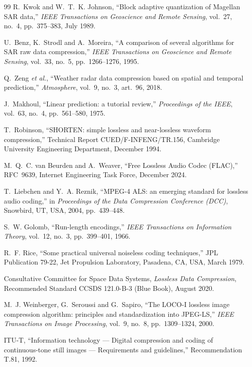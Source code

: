 \begin{thebibliography}{99}
R.~Kwok and W.~T.~K. Johnson, ``Block adaptive quantization of Magellan SAR
data,'' \emph{IEEE Transactions on Geoscience and Remote Sensing}, vol.~27,
no.~4, pp.~375--383, July 1989.

U.~Benz, K.~Strodl and A.~Moreira, ``A comparison of several algorithms for SAR
raw data compression,'' \emph{IEEE Transactions on Geoscience and Remote
Sensing}, vol.~33, no.~5, pp.~1266--1276, 1995.

Q.~Zeng \emph{et al.}, ``Weather radar data compression based on spatial and
temporal prediction,'' \emph{Atmosphere}, vol.~9, no.~3, art.~96, 2018.

J.~Makhoul, ``Linear prediction: a tutorial review,'' \emph{Proceedings of the
IEEE}, vol.~63, no.~4, pp.~561--580, 1975.

T.~Robinson, ``SHORTEN: simple lossless and near-lossless waveform
compression,'' Technical Report CUED/F-INFENG/TR.156, Cambridge University
Engineering Department, December 1994.

M.~Q.~C. van Beurden and A.~Weaver, ``Free Lossless Audio Codec (FLAC),''
RFC~9639, Internet Engineering Task Force, December 2024.

T.~Liebchen and Y.~A. Reznik, ``MPEG-4 ALS: an emerging standard for lossless
audio coding,'' in \emph{Proceedings of the Data Compression Conference (DCC)},
Snowbird, UT, USA, 2004, pp.~439--448.

S.~W. Golomb, ``Run-length encodings,'' \emph{IEEE Transactions on Information
Theory}, vol.~12, no.~3, pp.~399--401, 1966.

R.~F. Rice, ``Some practical universal noiseless coding techniques,'' JPL
Publication 79-22, Jet Propulsion Laboratory, Pasadena, CA, USA, March 1979.

Consultative Committee for Space Data Systems, \emph{Lossless Data
Compression}, Recommended Standard CCSDS 121.0-B-3 (Blue Book), August 2020.

M.~J. Weinberger, G.~Seroussi and G.~Sapiro, ``The LOCO-I lossless image
compression algorithm: principles and standardization into JPEG-LS,''
\emph{IEEE Transactions on Image Processing}, vol.~9, no.~8, pp.~1309--1324,
2000.

ITU-T, ``Information technology --- Digital compression and coding of
continuous-tone still images --- Requirements and guidelines,'' Recommendation
T.81, 1992.


\end{thebibliography}
